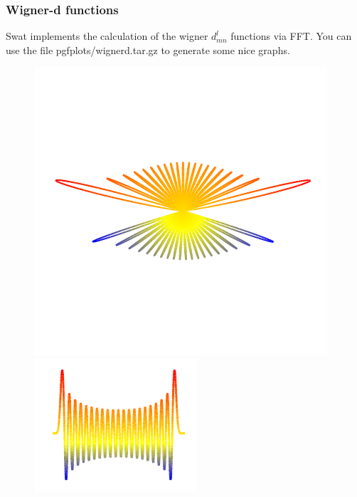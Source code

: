 \documentclass[12pt]{article}
\begin{document}
%
%
%
%

\subsubsection{Wigner-d functions}

Swat implements the calculation of the wigner $d^l_{mn}$ functions via FFT.
You can use the file pgfplots/wignerd.tar.gz to generate some nice graphs.

\begin{figure}
\centering
\includegraphics[scale=1.0]{wignerpolar.pdf}
\includegraphics[scale=1.0]{wigner.pdf} 
\end{figure}
\end{document}
